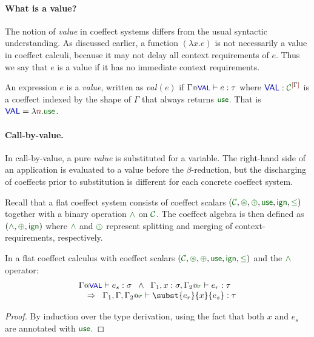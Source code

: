 \paragraph{What is a value?}
The notion of \emph{value} in coeffect systems differs from the usual syntactic understanding.
As discussed earlier, a function $(\lambda x.e)$ is not necessarily a value in coeffect calculi, 
because it may not delay all context requirements of $e$. Thus we say that $e$ is a value if it
has no immediate context requirements.

\begin{definition} 
An expression $e$ is a \emph{value}, written as $\textit{val}(e)$ if $\coctx{\Gamma}{ \aclrd{\mathsf{VAL}} } \vdash e : \tau$ 
where $\aclrd{\mathsf{VAL}} : \C^{\mksh{\Gamma}}$ is a coeffect indexed by the shape of $\Gamma$ that
always returns $\cunit$. That is $\aclrd{\mathsf{VAL}} = \lambda \sclrd{n} . \cunit$.
\end{definition}

\paragraph{Call-by-value.}
In call-by-value, a pure \emph{value} is substituted for a variable. 
The right-hand side of an application is evaluated to a value before the
$\beta$-reduction, but the discharging of coeffects prior to substitution is
different for each concrete coeffect system.  

Recall that a flat coeffect system consists of coeffect scalars $(\C, \cseq, \cpar, \cunit, \czero, \cleq)$ 
together with a binary operation $\cclrd{\wedge}$ on $\C$. The coeffect algebra is then defined
as $(\cclrd{\wedge}, \cpar, \czero)$ where $\cclrd{\wedge}$ and $\cpar$ represent splitting and
merging of context-requirements, respectively.

\begin{lemma}
\label{thm:flat-subst-cbv}
In a flat coeffect calculus with coeffect scalars $(\C, \cseq, \cpar, \cunit, \czero, \cleq)$ 
and the $\cclrd{\wedge}$ operator:
\[
\begin{array}{l}
\coctx{\Gamma}{\aclrd{\mathsf{VAL}}} \vdash e_s : \sigma \;\; \wedge \;\; \coctx{\Gamma_1,  x : \sigma, \Gamma_2}{ \cclrd{r}  } \vdash e_r : \tau\\
\quad \Rightarrow \;\; \coctx{\Gamma_1,\Gamma,\Gamma_2}{ \cclrd{r} } \vdash \subst{e_r}{x}{e_s} : \tau
\end{array}
\]
\end{lemma}
\begin{proof}
By induction over the type derivation, using the fact that both $x$ and $e_s$ are annotated
with $\cunit$.
\end{proof}

